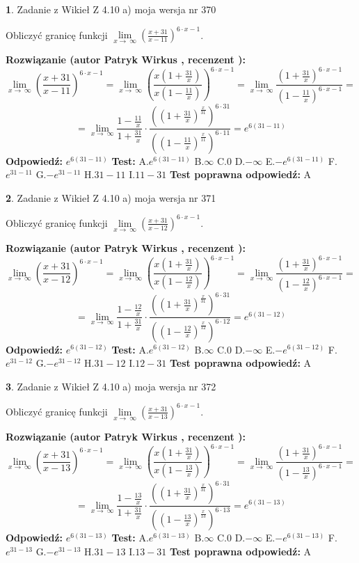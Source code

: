 \documentclass[12pt, a4paper]{article}
\theoremstyle{definition} %
\newtheorem{zad}{}
\newcommand{\zadStart}[1]{\begin{zad}#1\newline}
\newcommand{\zadStop}{\end{zad}}
\newcommand{\rozwStart}[2]{\noindent \textbf{Rozwiązanie (autor #1 , recenzent #2): }\newline}
\newcommand{\rozwStop}{\newline}
\newcommand{\odpStart}{\noindent \textbf{Odpowiedź:}\newline}
\newcommand{\odpStop}{\newline}
\newcommand{\testStart}{\noindent \textbf{Test:}\newline}
\newcommand{\testStop}{\newline}
\newcommand{\kluczStart}{\noindent \textbf{Test poprawna odpowiedź:}\newline}
\newcommand{\kluczStop}{\newline}
\begin{document}
\zadStart{Zadanie z Wikieł Z 4.10 a) moja wersja nr 370}


Obliczyć granicę funkcji  $\lim\limits_{x\to\ \infty}(\frac{x+31}{x-11})^{6\cdot x-1}$.
\zadStop
\rozwStart{Patryk Wirkus}{}
$$\lim\limits_{x\to\ \infty}(\frac{x+31}{x-11})^{6\cdot x-1} = \lim\limits_{x\to\ \infty}(\frac{x(1+\frac{31}{x})}{x(1-\frac{11}{x})})^{6\cdot x-1}=\lim\limits_{x\to\ \infty}\frac{(1+\frac{31}{x})^{6\cdot x-1}}{(1-\frac{11}{x})^{6\cdot x-1}}=$$
$$=\lim\limits_{x\to\ \infty}\frac{1-\frac{11}{x}}{1+\frac{31}{x}}\cdot\frac{((1+\frac{31}{x})^{\frac{x}{31}})^{6\cdot31}}{((1-\frac{11}{x})^{\frac{x}{11}})^{6\cdot11}}=e^{6(31-11)}$$
\rozwStop
\odpStart
$e^{6(31-11)}$
\odpStop
\testStart
A.$e^{6(31-11)}$ B.$\infty$ C.$0$ D.$-\infty$ E.$-e^{6(31-11)}$
F.$e^{31-11}$ G.$-e^{31-11}$
H.$31-11$
I.$11-31$
\testStop
\kluczStart
A
\kluczStop



\zadStart{Zadanie z Wikieł Z 4.10 a) moja wersja nr 371}


Obliczyć granicę funkcji  $\lim\limits_{x\to\ \infty}(\frac{x+31}{x-12})^{6\cdot x-1}$.
\zadStop
\rozwStart{Patryk Wirkus}{}
$$\lim\limits_{x\to\ \infty}(\frac{x+31}{x-12})^{6\cdot x-1} = \lim\limits_{x\to\ \infty}(\frac{x(1+\frac{31}{x})}{x(1-\frac{12}{x})})^{6\cdot x-1}=\lim\limits_{x\to\ \infty}\frac{(1+\frac{31}{x})^{6\cdot x-1}}{(1-\frac{12}{x})^{6\cdot x-1}}=$$
$$=\lim\limits_{x\to\ \infty}\frac{1-\frac{12}{x}}{1+\frac{31}{x}}\cdot\frac{((1+\frac{31}{x})^{\frac{x}{31}})^{6\cdot31}}{((1-\frac{12}{x})^{\frac{x}{12}})^{6\cdot12}}=e^{6(31-12)}$$
\rozwStop
\odpStart
$e^{6(31-12)}$
\odpStop
\testStart
A.$e^{6(31-12)}$ B.$\infty$ C.$0$ D.$-\infty$ E.$-e^{6(31-12)}$
F.$e^{31-12}$ G.$-e^{31-12}$
H.$31-12$
I.$12-31$
\testStop
\kluczStart
A
\kluczStop



\zadStart{Zadanie z Wikieł Z 4.10 a) moja wersja nr 372}


Obliczyć granicę funkcji  $\lim\limits_{x\to\ \infty}(\frac{x+31}{x-13})^{6\cdot x-1}$.
\zadStop
\rozwStart{Patryk Wirkus}{}
$$\lim\limits_{x\to\ \infty}(\frac{x+31}{x-13})^{6\cdot x-1} = \lim\limits_{x\to\ \infty}(\frac{x(1+\frac{31}{x})}{x(1-\frac{13}{x})})^{6\cdot x-1}=\lim\limits_{x\to\ \infty}\frac{(1+\frac{31}{x})^{6\cdot x-1}}{(1-\frac{13}{x})^{6\cdot x-1}}=$$
$$=\lim\limits_{x\to\ \infty}\frac{1-\frac{13}{x}}{1+\frac{31}{x}}\cdot\frac{((1+\frac{31}{x})^{\frac{x}{31}})^{6\cdot31}}{((1-\frac{13}{x})^{\frac{x}{13}})^{6\cdot13}}=e^{6(31-13)}$$
\rozwStop
\odpStart
$e^{6(31-13)}$
\odpStop
\testStart
A.$e^{6(31-13)}$ B.$\infty$ C.$0$ D.$-\infty$ E.$-e^{6(31-13)}$
F.$e^{31-13}$ G.$-e^{31-13}$
H.$31-13$
I.$13-31$
\testStop
\kluczStart
A
\kluczStop
\end{document}

